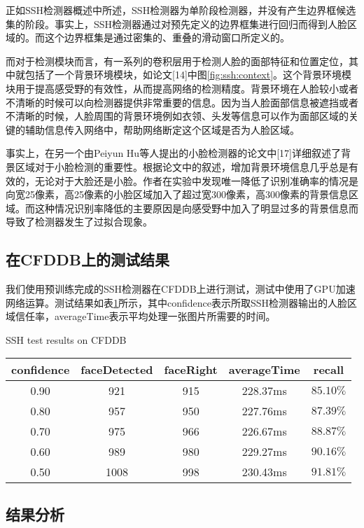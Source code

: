 正如SSH检测器概述中所述，SSH检测器为单阶段检测器，并没有产生边界框候选集的阶段。事实上，SSH检测器通过对预先定义的边界框集进行回归而得到人脸区域的。而这个边界框集是通过密集的、重叠的滑动窗口所定义的。

而对于检测模块而言，有一系列的卷积层用于检测人脸的面部特征和位置定位，其中就包括了一个背景环境模块，如论文[14]中图\ref{fig:ssh:context}。这个背景环境模块用于提高感受野的有效性，从而提高网络的检测精度。背景环境在人脸较小或者不清晰的时候可以向检测器提供非常重要的信息。因为当人脸面部信息被遮挡或者不清晰的时候，人脸周围的背景环境例如衣领、头发等信息可以作为面部区域的关键的辅助信息传入网络中，帮助网络断定这个区域是否为人脸区域。

事实上，在另一个由Peiyun Hu等人提出的小脸检测器的论文中[17]详细叙述了背景区域对于小脸检测的重要性。根据论文中的叙述，增加背景环境信息几乎总是有效的，无论对于大脸还是小脸。作者在实验中发现唯一降低了识别准确率的情况是向宽25像素，高25像素的小脸区域加入了超过宽300像素，高300像素的背景信息区域。而这种情况识别率降低的主要原因是向感受野中加入了明显过多的背景信息而导致了检测器发生了过拟合现象。


\subsection{在CFDDB上的测试结果}

我们使用预训练完成的SSH检测器在CFDDB上进行测试，测试中使用了GPU加速网络运算。测试结果如表\ref{tab:ssh}所示，其中confidence表示所取SSH检测器输出的人脸区域信任率，averageTime表示平均处理一张图片所需要的时间。

\begin{table}[!hpb]
	\centering
	{SSH test results on CFDDB}
	\label{tab:ssh}
	\begin{tabular}{ cccc | c }
		\hline
		confidence & faceDetected & faceRight & averageTime & recall\\
		\hline
		0.90 & 921 & 915 & 228.37ms & $85.10\%$\\
		0.80 & 957 & 950 & 227.76ms & $87.39\%$\\
		0.70 & 975 & 966 & 226.67ms & $88.87\%$\\
		0.60 & 989 & 980 & 229.27ms & $90.16\%$\\
		0.50 & 1008 & 998 & 230.43ms & $91.81\%$\\
		\hline
	\end{tabular}
\end{table}

\subsection{结果分析}

